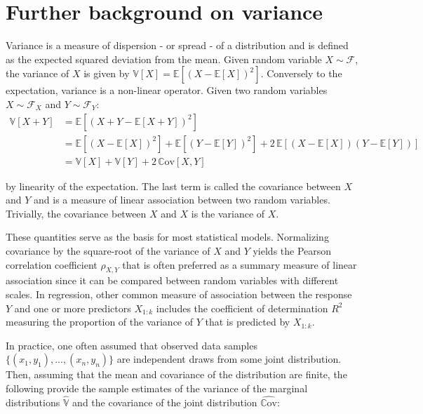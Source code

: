 \chapter{Further background on variance}

Variance is a measure of dispersion - or spread - of a distribution and is defined as the expected squared deviation from the mean. Given random variable $X \sim \mathcal{F}$, the variance of $X$ is given by $\mathbb{V}[X] = \mathbb{E}\left[ (X-\mathbb{E}[X])^2 \right]$. Conversely to the expectation, variance is a non-linear operator. Given two random variables $X \sim \mathcal{F}_X$ and $Y \sim \mathcal{F}_Y$: 
\begin{equation}
\begin{aligned}
\mathbb{V}[X+Y] & = \mathbb{E}\left[ (X+Y - \mathbb{E}[X+Y])^2\right] \\
& = \mathbb{E} \left[ (X - \mathbb{E}[X])^2\right] + \mathbb{E} \left[ (Y - \mathbb{E}[Y])^2\right] + 2 \, \mathbb{E}\left[ (X - \mathbb{E}[X])(Y-\mathbb{E}[Y]) \right] \\
& = \mathbb{V}[X] + \mathbb{V}[Y] + 2 \, \mathbb{C}\text{ov}[X,Y]
\end{aligned}
\end{equation}

by linearity of the expectation. The last term is called the covariance between $X$ and $Y$ and is a measure of linear association between two random variables. Trivially, the covariance between $X$ and $X$ is the variance of $X$.

These quantities serve as the basis for most statistical models. Normalizing covariance by the square-root of the variance of $X$ and $Y$ yields the Pearson correlation coefficient $\rho_{X,Y}$ that is often preferred as a summary measure of linear association since it can be compared between random variables with different scales. In regression, other common measure of association between the response $Y$ and one or more predictors $X_{1:k}$ includes the coefficient of determination $R^2$ measuring the proportion of the variance of $Y$ that is predicted by $X_{1:k}$.

In practice, one often assumed that observed data samples $\{(x_{1},y_{1}),...,(x_n,y_n)\}$ are independent draws from some joint distribution. Then, assuming that the mean and covariance of the distribution are finite, the following provide the sample estimates of the variance of the marginal distributions $\hat{\mathbb{V}}$ and the covariance of the joint distribution $\hat{\mathbb{C}\text{ov}}$:

